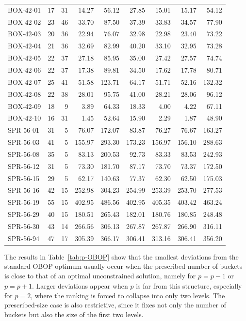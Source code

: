 \documentclass[pdflatex,basic,Numbered]{jnl}%
\theoremstyle{plain}
\theoremstyle{remark}
\theoremstyle{thmstyleone}%
\theoremstyle{thmstylethree}%
\begin{document}
\begin{longtable}{lrr rrrrrr}
BOX-42-01 & 17 & 31 & 14.27 & 56.12 & 27.85 & 15.01 & 15.17 & 54.12 \\
BOX-42-02 & 23 & 46 & 33.70 & 87.50 & 37.39 & 33.83 & 34.57 & 77.90 \\
BOX-42-03 & 20 & 36 & 22.94 & 76.07 & 32.98 & 22.98 & 23.40 & 73.22 \\
BOX-42-04 & 21 & 36 & 32.69 & 82.99 & 40.20 & 33.10 & 32.95 & 73.28 \\
BOX-42-05 & 22 & 37 & 27.18 & 85.95 & 35.00 & 27.42 & 27.57 & 74.74 \\
BOX-42-06 & 22 & 37 & 17.38 & 89.81 & 34.50 & 17.62 & 17.78 & 80.71 \\
BOX-42-07 & 25 & 41 & 51.58 & 123.71 & 64.17 & 51.71 & 52.16 & 132.32 \\
BOX-42-08 & 22 & 38 & 28.01 & 95.75 & 41.00 & 28.21 & 28.06 & 96.12 \\
BOX-42-09 & 18 & 9 & 3.89 & 64.33 & 18.33 & 4.00 & 4.22 & 67.11 \\
BOX-42-10 & 16 & 31 & 1.45 & 52.64 & 15.90 & 2.29 & 1.87 & 48.90 \\[0.2em]

SPR-56-01 & 31 & 5 & 76.07 & 172.07 & 83.87 & 76.27 & 76.67 & 163.27 \\
SPR-56-03 & 41 & 5 & 155.97 & 293.30 & 173.23 & 156.97 & 156.10 & 288.63 \\
SPR-56-08 & 35 & 5 & 83.13 & 200.53 & 92.73 & 83.33 & 83.53 & 242.93 \\
SPR-56-12 & 31 & 5 & 73.30 & 181.70 & 87.17 & 73.70 & 73.37 & 172.50 \\
SPR-56-15 & 29 & 5 & 62.17 & 140.63 & 77.37 & 62.30 & 62.50 & 175.03 \\
SPR-56-16 & 42 & 15 & 252.98 & 304.23 & 254.99 & 253.39 & 253.70 & 277.53 \\
SPR-56-19 & 55 & 15 & 402.95 & 486.56 & 402.95 & 405.35 & 403.42 & 463.24 \\
SPR-56-29 & 40 & 15 & 180.51 & 265.43 & 182.01 & 180.76 & 180.85 & 248.48 \\
SPR-56-30 & 43 & 14 & 266.56 & 306.13 & 267.87 & 267.87 & 266.90 & 316.11 \\
SPR-56-94 & 47 & 17 & 305.39 & 366.17 & 306.41 & 313.16 & 306.41 & 356.20 \\

\end{longtable}
\endgroup

The results in Table~\ref{tab:p-OBOP} show that the smallest deviations from the standard {\rm OBOP} optimum usually occur when the prescribed number of buckets is close to that of an optimal unconstrained solution, namely for \(p=\underline p-1\) or \(p=\overline p+1\). Larger deviations appear when \(p\) is far from this structure, especially for \(p=2\), where the ranking is forced to collapse into only two levels. The prescribed-size case is also restrictive, since it fixes not only the number of buckets but also the size of the first two levels.
\end{document}
